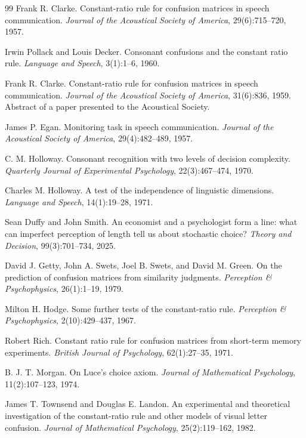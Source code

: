 \documentclass[11pt]{article}
\begin{document}
\begin{thebibliography}{99}
Frank R. Clarke.
Constant-ratio rule for confusion matrices in speech communication.
\emph{Journal of the Acoustical Society of America}, 29(6):715--720, 1957.

Irwin Pollack and Louis Decker.
Consonant confusions and the constant ratio rule.
\emph{Language and Speech}, 3(1):1--6, 1960.

Frank R. Clarke.
Constant-ratio rule for confusion matrices in speech communication.
\emph{Journal of the Acoustical Society of America}, 31(6):836, 1959.
Abstract of a paper presented to the Acoustical Society.

James P. Egan.
Monitoring task in speech communication.
\emph{Journal of the Acoustical Society of America}, 29(4):482--489, 1957.

C. M. Holloway.
Consonant recognition with two levels of decision complexity.
\emph{Quarterly Journal of Experimental Psychology}, 22(3):467--474, 1970.

Charles M. Holloway.
A test of the independence of linguistic dimensions.
\emph{Language and Speech}, 14(1):19--28, 1971.

Sean Duffy and John Smith.
An economist and a psychologist form a line: what can imperfect perception of length tell us
about stochastic choice?
\emph{Theory and Decision}, 99(3):701--734, 2025.

David J. Getty, John A. Swets, Joel B. Swets, and David M. Green.
On the prediction of confusion matrices from similarity judgments.
\emph{Perception \& Psychophysics}, 26(1):1--19, 1979.

Milton H. Hodge.
Some further tests of the constant-ratio rule.
\emph{Perception \& Psychophysics}, 2(10):429--437, 1967.

Robert Rich.
Constant ratio rule for confusion matrices from short-term memory experiments.
\emph{British Journal of Psychology}, 62(1):27--35, 1971.

B. J. T. Morgan.
On Luce's choice axiom.
\emph{Journal of Mathematical Psychology}, 11(2):107--123, 1974.

James T. Townsend and Douglas E. Landon.
An experimental and theoretical investigation of the constant-ratio rule and other models
of visual letter confusion.
\emph{Journal of Mathematical Psychology}, 25(2):119--162, 1982.


\end{thebibliography}
\end{document}
